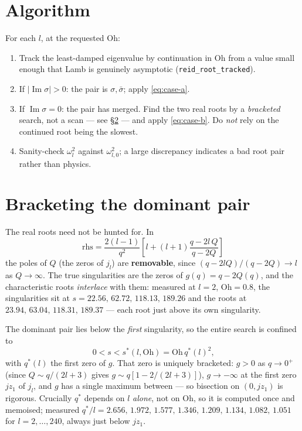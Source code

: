 \documentclass[11pt]{article}
\newcommand{\Oh}{\mathrm{Oh}}
\begin{document}
\section{Algorithm}

For each $l$, at the requested $\Oh$:
\begin{enumerate}
  \item Track the least-damped eigenvalue by continuation in $\Oh$ from a value small enough
        that Lamb is genuinely asymptotic (\texttt{reid\_root\_tracked}).
  \item If $|\operatorname{Im}\sigma|>0$: the pair is $\sigma,\bar\sigma$; apply
        \eqref{eq:case-a}.
  \item If $\operatorname{Im}\sigma=0$: the pair has merged. Find the two real roots by a
        \emph{bracketed} search, not a scan --- see \S\ref{sec:bracket} --- and apply
        \eqref{eq:case-b}. Do \emph{not} rely on the continued root being the slowest.
  \item Sanity-check $\omega_l^2$ against $\omega_{l,0}^2$; a large discrepancy indicates a
        bad root pair rather than physics.
\end{enumerate}

\section{Bracketing the dominant pair}
\label{sec:bracket}

The real roots need not be hunted for. In
\begin{equation}
  \text{rhs} = \frac{2(l-1)}{q^2}\left[l + (l+1)\frac{q-2l\,Q}{q-2Q}\right]
  \label{eq:rhs}
\end{equation}
the poles of $Q$ (the zeros of $j_l$) are \textbf{removable}, since
$(q-2lQ)/(q-2Q)\to l$ as $Q\to\infty$. The true singularities are the zeros of
$g(q)=q-2Q(q)$, and the characteristic roots \emph{interlace} with them: measured at $l=2$,
$\Oh=0.8$, the singularities sit at $s=22.56,\,62.72,\,118.13,\,189.26$ and the roots at
$23.94,\,63.04,\,118.31,\,189.37$ --- each root just above its own singularity.

The dominant pair lies below the \emph{first} singularity, so the entire search is confined to
\begin{equation}
  0 < s < s^\ast(l,\Oh) = \Oh\,q^\ast(l)^2\text{,}
  \label{eq:bracket}
\end{equation}
with $q^\ast(l)$ the first zero of $g$. That zero is uniquely bracketed: $g>0$ as $q\to0^+$
(since $Q\sim q/(2l+3)$ gives $g\sim q[1-2/(2l+3)]$), $g\to-\infty$ at the first zero
$jz_1$ of $j_l$, and $g$ has a single maximum between --- so bisection on $(0,jz_1)$ is
rigorous. Crucially $q^\ast$ depends on $l$ \emph{alone}, not on $\Oh$, so it is computed once
and memoised; measured $q^\ast/l = 2.656,\,1.972,\,1.577,\,1.346,\,1.209,\,1.134,\,1.082,\,
1.051$ for $l=2,\dots,240$, always just below $jz_1$.
\end{document}
